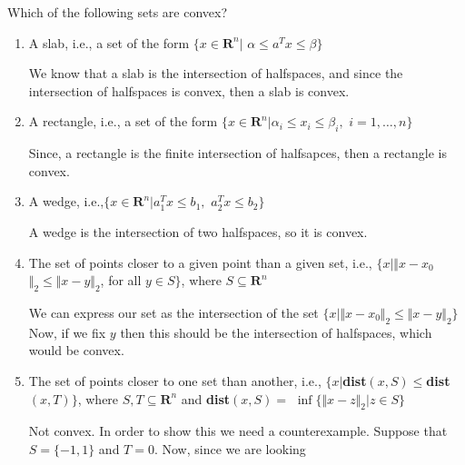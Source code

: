 \begin{prob}[1.7] Which of the following sets are convex?
\end{prob}
  \begin{enumerate}[label=(\alph*)]
  \item{A slab, i.e., a set of the form $\{x \in \mathbf{R}^{n} \vert $
    $\alpha \leq a^{T}x \leq \beta \}$\\
    \begin{sol}
      We know that a slab is the intersection of halfspaces, and since the
      intersection of halfspaces is convex, then a slab is convex.
  \end{sol}}
  \item{A rectangle, i.e., a set of the form
    $\{x \in \mathbf{R}^{n} \vert \alpha_{i} \leq x_{i} \leq \beta_{i},$
    $i = 1, \ldots, n\}$\\
    \begin{sol}
      Since, a rectangle is the finite intersection of halfsapces, then
      a rectangle is convex.
  \end{sol}}
  \item{A wedge, i.e.,$\{x \in \mathbf{R}^{n} \vert a_{1}^{T}x \leq b_{1},$
    $a_{2}^{T}x \leq b_{2}\}$\\
    \begin{sol}
      A wedge is the intersection of two halfspaces, so it is convex.
  \end{sol}}    
  \item{The set of points closer to a given point than a given set, i.e., $\{x \vert \Vert x - x_{0}$
    $\Vert_{2} \leq \Vert x - y \Vert_{2}$, for all $y \in S\}$, where
    $S \subseteq \mathbf{R}^{n}$\\
    \begin{sol}
      We can express our set as the intersection of the set
      $\{x \vert \Vert x - x_{0}\Vert_{2} \leq \Vert x - y \Vert_{2}\}$ Now, if
      we fix $y$ then this should be the intersection of halfspaces, which
      would be convex.
  \end{sol}}    
  \item{The set of points closer to one set than another, i.e.,
    $\{x \vert $\textbf{dist}$(x,S) \leq $\textbf{dist}$(x,T)\}$, where
    $S,T \subseteq \mathbf{R}^{n}$ and \textbf{dist}$(x,S) = $
    $\inf\{\Vert x- z \Vert_{2} \vert z \in S\}$\\
    \begin{sol}
      Not convex. In order to show this we need a counterexample.
      Suppose that $S = \{-1,1\}$ and $T = {0}$. Now, since we are looking

\end{sol}}
\end{enumerate}
